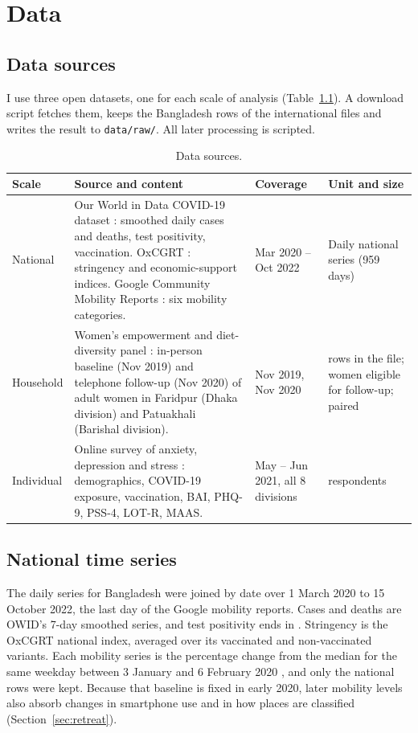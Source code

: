 \chapter{Data}\label{ch:data}

\section{Data sources}
I use three open datasets, one for each scale of analysis (Table~\ref{tab:sources}). A download script fetches them, keeps the Bangladesh rows of the international files and writes the result to \texttt{data/raw/}. All later processing is scripted.

\begin{table}[!h]
\centering\small
\caption{Data sources.}\label{tab:sources}
\begin{tabularx}{\linewidth}{@{}p{2.1cm}Xp{2.4cm}p{2.7cm}@{}}
\toprule
Scale & Source and content & Coverage & Unit and size \\
\midrule
National & Our World in Data COVID-19 dataset \parencite{owid2024}: smoothed daily cases and deaths, test positivity, vaccination. OxCGRT \parencite{hale2021}: stringency and economic-support indices. Google Community Mobility Reports \parencite{google2022}: six mobility categories. & Mar 2020 -- Oct 2022 & Daily national series (959 days) \\
Household & Women's empowerment and diet-diversity panel \parencite{panel2021}: in-person baseline (Nov 2019) and telephone follow-up (Nov 2020) of adult women in Faridpur (Dhaka division) and Patuakhali (Barishal division). & Nov 2019, Nov 2020 & \PanRaw{} rows in the file; \PanBase{} women eligible for follow-up; \PanN{} paired \\
Individual & Online survey of anxiety, depression and stress \parencite{mhdata2022,islam2023}: demographics, COVID-19 exposure, vaccination, BAI, PHQ-9, PSS-4, LOT-R, MAAS. & May -- Jun 2021, all 8 divisions & \MhRaw{} respondents \\
\bottomrule
\end{tabularx}
\end{table}

\section{National time series}
The daily series for Bangladesh were joined by date over 1 March 2020 to 15 October 2022, the last day of the Google mobility reports. Cases and deaths are OWID's 7-day smoothed series, and test positivity ends in \PosLastDate. Stringency is the OxCGRT national index, averaged over its vaccinated and non-vaccinated variants. Each mobility series is the percentage change from the median for the same weekday between 3 January and 6 February 2020 \parencite{google2022}, and only the national rows were kept. Because that baseline is fixed in early 2020, later mobility levels also absorb changes in smartphone use and in how places are classified (Section~\ref{sec:retreat}).

